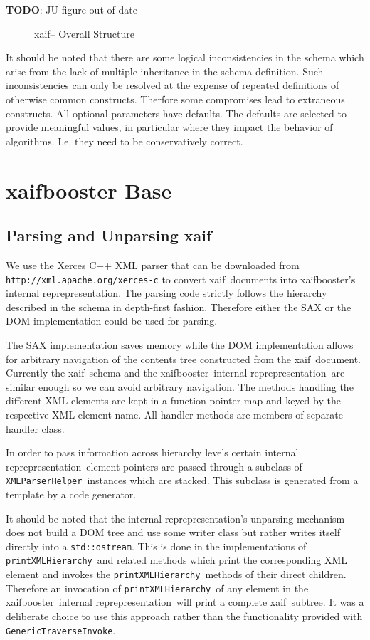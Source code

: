 \documentclass{book}
\newcommand{\InternalRep}{internal reprepresentation}
\newcommand{\todo}{{\bf TODO}}
\newcommand{\xaif}{xaif}
\newcommand{\xaifbooster}{xaifbooster}
\newcommand{\GenericTraverseInvoke}{{\tt GenericTraverseInvoke}}
\newcommand{\XMLParserHelper}{{\tt XMLParserHelper}}
\newcommand{\printXMLHierarchy}{{\tt printXMLHierarchy}}
\begin{document}
\todo: JU figure out of date
\begin{figure}
\caption{\xaif -- Overall Structure}
\label{fig:xaif_structure}
\end{figure}

It should be noted that there are some logical inconsistencies in the schema
which arise from the lack of multiple inheritance in the schema 
definition. Such inconsistencies can only be resolved at the expense of 
repeated definitions of otherwise common constructs. Therfore some 
compromises lead to extraneous constructs.
All optional parameters have defaults. The defaults are selected to 
provide meaningful values, in particular where they impact the 
behavior of algorithms. I.e. they need to be conservatively correct.  

\chapter{xaifbooster Base}

\section{Parsing and Unparsing \xaif}
\label{sec:Parsing_and_Unparsing_xaif}
We use the Xerces C++ XML parser 
that can be downloaded from
{\tt http://xml.apache.org/xerces-c} to convert
\xaif\ documents into \xaifbooster's \InternalRep.
The parsing code strictly follows the hierarchy 
described in the schema in depth-first fashion. 
Therefore either the SAX or the DOM implementation 
could be used for parsing. 
 
The SAX implementation saves memory while the DOM 
implementation allows for arbitrary navigation of the contents tree   
constructed from the \xaif\ document.
Currently the \xaif\ schema and the \xaifbooster\ \InternalRep\ are similar
enough so we can avoid arbitrary navigation.
The methods handling the different XML elements are kept in a function pointer 
map and keyed by the respective XML element name. All handler methods are 
members of separate handler class.

In order to pass information across hierarchy levels certain 
\InternalRep\ element pointers are passed through a subclass of  
\XMLParserHelper\ instances which are stacked. This subclass is 
generated from a template by a code generator.

It should be noted that the \InternalRep's unparsing mechanism does not 
build a DOM tree and use some writer class but rather writes itself directly into a
{\tt std::ostream}. This is done in the implementations of \printXMLHierarchy\
and related methods which print the corresponding XML element and invokes the \printXMLHierarchy\
methods of their direct children. Therefore an invocation of \printXMLHierarchy\ of any element 
in the \xaifbooster\ \InternalRep\ will print a complete \xaif\ subtree.
It was a deliberate choice to use this approach rather than the functionality provided with 
\GenericTraverseInvoke.
\end{document}
